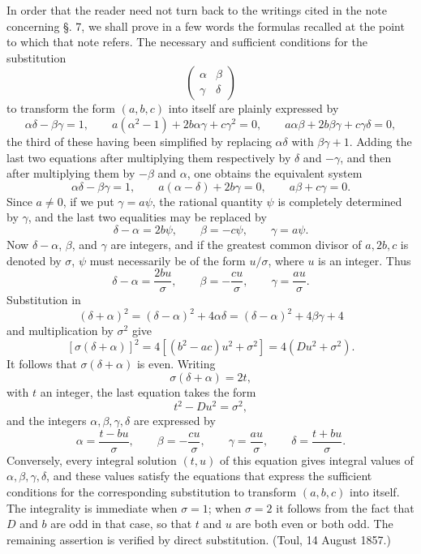 \documentclass[11pt]{article}
\begin{document}
In order that the reader need not turn back to the writings cited in the note concerning \S. 7, we shall prove in a few words the formulas recalled at the point to which that note refers. The necessary and sufficient conditions for the substitution
\[
  \begin{pmatrix}\alpha&\beta\\ \gamma&\delta\end{pmatrix}
\]
to transform the form $(a,b,c)$ into itself are plainly expressed by
\[
  \alpha\delta-\beta\gamma=1,
  \qquad
  a(\alpha^2-1)+2b\alpha\gamma+c\gamma^2=0,
  \qquad
  a\alpha\beta+2b\beta\gamma+c\gamma\delta=0,
\]
the third of these having been simplified by replacing $\alpha\delta$ with $\beta\gamma+1$. Adding the last two equations after multiplying them respectively by $\delta$ and $-\gamma$, and then after multiplying them by $-\beta$ and $\alpha$, one obtains the equivalent system
\[
  \alpha\delta-\beta\gamma=1,
  \qquad
  a(\alpha-\delta)+2b\gamma=0,
  \qquad
  a\beta+c\gamma=0.
\]
Since $a\ne0$, if we put $\gamma=a\psi$, the rational quantity $\psi$ is completely determined by $\gamma$, and the last two equalities may be replaced by
\[
  \delta-\alpha=2b\psi,
  \qquad
  \beta=-c\psi,
  \qquad
  \gamma=a\psi.
\]
Now $\delta-\alpha$, $\beta$, and $\gamma$ are integers, and if the greatest common divisor of $a,2b,c$ is denoted by $\sigma$, $\psi$ must necessarily be of the form $u/\sigma$, where $u$ is an integer. Thus
\[
  \delta-\alpha=\frac{2bu}{\sigma},\qquad
  \beta=-\frac{cu}{\sigma},\qquad
  \gamma=\frac{au}{\sigma}.
\]
Substitution in
\[
  (\delta+\alpha)^2=(\delta-\alpha)^2+4\alpha\delta
       =(\delta-\alpha)^2+4\beta\gamma+4
\]
and multiplication by $\sigma^2$ give
\[
  [\sigma(\delta+\alpha)]^2=4[(b^2-ac)u^2+\sigma^2]
      =4(Du^2+\sigma^2).
\]
It follows that $\sigma(\delta+\alpha)$ is even. Writing
\[
  \sigma(\delta+\alpha)=2t,
\]
with $t$ an integer, the last equation takes the form
\[
  t^2-Du^2=\sigma^2,
\]
and the integers $\alpha,\beta,\gamma,\delta$ are expressed by
\[
 \alpha=\frac{t-bu}{\sigma},\qquad
 \beta=-\frac{cu}{\sigma},\qquad
 \gamma=\frac{au}{\sigma},\qquad
 \delta=\frac{t+bu}{\sigma}.
\]
Conversely, every integral solution $(t,u)$ of this equation gives integral values of $\alpha,\beta,\gamma,\delta$, and these values satisfy the equations that express the sufficient conditions for the corresponding substitution to transform $(a,b,c)$ into itself. The integrality is immediate when $\sigma=1$; when $\sigma=2$ it follows from the fact that $D$ and $b$ are odd in that case, so that $t$ and $u$ are both even or both odd. The remaining assertion is verified by direct substitution. \hfill(Toul, 14 August 1857.)
\end{document}
